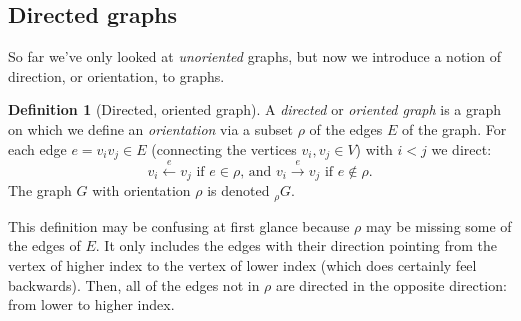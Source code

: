 \documentclass{amsart}
\theoremstyle{plain}
\theoremstyle{remark}
\theoremstyle{definition}
\newtheorem*{definition*}{Definition}
\newenvironment{definition}%
  {\begin{leftbar}\begin{definition*}
}{%
  \end{definition*}\end{leftbar}
}
\begin{document}
\subsection{Directed graphs}

So far we've only looked at \emph{unoriented} graphs, but
now we introduce a notion of direction, or orientation, to graphs.
\begin{definition}[Directed, oriented graph]
  A \emph{directed} or \emph{oriented graph} is a graph on which we
  define an \emph{orientation} via a subset $\rho$ of the edges $E$ of the
  graph. For each edge $e=v_i v_j\in E$ (connecting the vertices $v_i,v_j\in
  V$) with $i<j$ we direct:
  \[
    v_i\stackrel{e}{\leftarrow}v_j\text{ if }e\in\rho\text{, and }
    v_i\stackrel{e}{\rightarrow}v_j\text{ if }e\notin\rho.
  \]
  The graph $G$ with orientation $\rho$ is denoted ${}_\rho G$.
\end{definition}
This definition may be confusing at first glance because $\rho$
may be missing some of the edges of $E$. It only includes the edges with
their direction pointing from the vertex of higher index to the vertex of lower
index (which does certainly feel backwards).
Then, all of the edges not in $\rho$ are directed in the opposite
direction: from lower to higher index.
\end{document}
